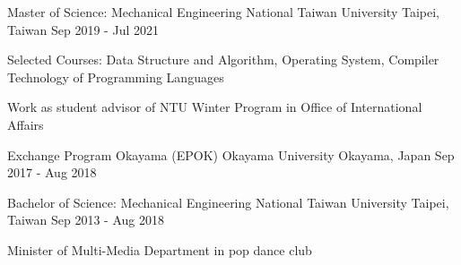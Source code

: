 \begin{cventries}
  \cventry
    {Master of Science: Mechanical Engineering} %
    {National Taiwan University} %
    {Taipei, Taiwan} %
    {Sep 2019 - Jul 2021} %
    {
        \vspace{0.3em}
      \begin{cvitems} %
        \item {Selected Courses: Data Structure and Algorithm, Operating System, Compiler Technology of Programming Languages }
        \vspace{0.1em}
        \item {Work as student advisor of NTU Winter Program in Office of International Affairs}
      \end{cvitems}
    }

  \cventry
    {Exchange Program Okayama (EPOK)} %
    {Okayama University} %
    {Okayama, Japan} %
    {Sep 2017 - Aug 2018} %
    {
    }

  \cventry
    {Bachelor of Science: Mechanical Engineering} %
    {National Taiwan University} %
    {Taipei, Taiwan} %
    {Sep 2013 - Aug 2018} %
    {
        \vspace{0.3em}
      \begin{cvitems} %
        \item {Minister of Multi-Media Department in pop dance club}
      \end{cvitems}
    }
\end{cventries}
